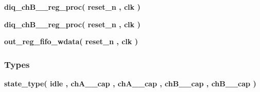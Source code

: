 \begin{DoxyCompactItemize}
\item 
{\bf diq\+\_\+ch\+B\+\_\+\_\+reg\+\_\+proc}{\bfseries  ( {\bfseries {\bfseries {\bf reset\+\_\+n}} \textcolor{vhdlchar}{ }} , {\bfseries {\bfseries {\bf clk}} \textcolor{vhdlchar}{ }} )}
\item 
{\bf diq\+\_\+ch\+B\+\_\+\_\+reg\+\_\+proc}{\bfseries  ( {\bfseries {\bfseries {\bf reset\+\_\+n}} \textcolor{vhdlchar}{ }} , {\bfseries {\bfseries {\bf clk}} \textcolor{vhdlchar}{ }} )}
\item 
{\bf out\+\_\+reg\+\_\+fifo\+\_\+wdata}{\bfseries  ( {\bfseries {\bfseries {\bf reset\+\_\+n}} \textcolor{vhdlchar}{ }} , {\bfseries {\bfseries {\bf clk}} \textcolor{vhdlchar}{ }} )}
\end{DoxyCompactItemize}
\subsubsection*{Types}
 \begin{DoxyCompactItemize}
\item 
{\bfseries {\bf state\+\_\+type}{\bfseries \textcolor{vhdlchar}{(}\textcolor{vhdlchar}{ }\textcolor{vhdlchar}{idle}\textcolor{vhdlchar}{ }\textcolor{vhdlchar}{,}\textcolor{vhdlchar}{ }\textcolor{vhdlchar}{ch\+A\+\_\+\_\+cap}\textcolor{vhdlchar}{ }\textcolor{vhdlchar}{,}\textcolor{vhdlchar}{ }\textcolor{vhdlchar}{ch\+A\+\_\+\_\+cap}\textcolor{vhdlchar}{ }\textcolor{vhdlchar}{,}\textcolor{vhdlchar}{ }\textcolor{vhdlchar}{ch\+B\+\_\+\_\+cap}\textcolor{vhdlchar}{ }\textcolor{vhdlchar}{,}\textcolor{vhdlchar}{ }\textcolor{vhdlchar}{ch\+B\+\_\+\_\+cap}\textcolor{vhdlchar}{ }\textcolor{vhdlchar}{)}\textcolor{vhdlchar}{ }}} 
\end{DoxyCompactItemize}
